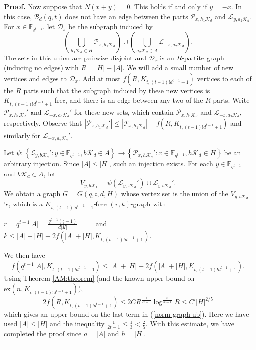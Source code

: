 \documentclass[12pt]{article}%
\newenvironment{proof}[1][Proof]{\noindent\textbf{#1.} }
{\hfill \ \rule{0.5em}{0.5em}}
\begin{document}
\begin{proof}
Now suppose that $N(x+y)  = 0$.  This holds if and only if $y = - x$.  In this case,  
$\mathcal{B}_d (q,t)$ does not have an edge between the parts $\mathcal{P}_{x , h_1 \mathcal{K}_d }$ and $\mathcal{L}_{ y , a_2 \mathcal{K}_d}$. 
For $x \in \mathbb{F}_{q^{t-1}}$, let $\mathcal{D}_{x}$ be the subgraph induced by 
\[
\left( \bigcup_{ h_1 \mathcal{K}_d \in H } \mathcal{P}_{x,h_1 \mathcal{K}_d} \right) \cup \left( 
\bigcup_{ a_2 \mathcal{K}_d \in A} \mathcal{L}_{-x,a_2 \mathcal{K}_d} 
\right).
\]
The sets in this union are pairwise disjoint 
and $\mathcal{D}_x$ is an $R$-partite graph (inducing no edges) with $R = |H| + |A|$.  
We will add a small number of new vertices and edges  to $\mathcal{D}_x$.  
Add at most $f( R , K_{ t , (t-1)! d^{t-1} + 1 } )$ vertices to each of the $R$ parts such that the subgraph induced by these new vertices is 
$K_{t , (t-1)!d^{t-1} + 1}$-free, and there is an edge between any two of the $R$ parts.  Write $\mathcal{P}_{x,h_1 \mathcal{K}_d}'$ and $\mathcal{L}_{ - x , a_2 \mathcal{K}_d}'$ for these new sets, which contain $\mathcal P_{x,h_1 \mathcal{K}_d}$ and $\mathcal L_{-x,a_2 \mathcal{K}_d}$, respectively.  Observe that 
$| \mathcal{P}_{x,h_1 \mathcal{K}_d}' | \leq 
| \mathcal{P}_{x,h_1 \mathcal{K}_d} | + f( R , K_{ t , (t-1)! d^{t-1} + 1 } )$ and similarly for $\mathcal{L}_{ - x , a_2 \mathcal{K}_d}'$.

Let $\psi:
 \left\{ \mathcal{L}_{y , b \mathcal{K}_d } ' : y \in \mathbb{F}_{q^{t-1} } , b \mathcal{K}_d \in A \right\}
	\rightarrow
		\left\{ \mathcal{P}_{x, h \mathcal{K}_d}' : x \in \mathbb{F}_{q^{t-1} } , h \mathcal{K}_d \in H \right\}
	$ be an arbitrary injection.  Since
 $|A| \leq |H|$, such an injection exists.  
 For each $y \in \mathbb{F}_{q^{t-1}}$ and $b \mathcal{K}_d \in A$, let 
\[
V_{ y,b \mathcal{K}_d} = \psi \left( \mathcal{L}_{y , b \mathcal{K}_d }' \right) \cup  \mathcal{L}_{y,b \mathcal{K}_d}' .
\]
We obtain a graph $G = G(q,t,d,H)$ whose vertex set is the union of the
$V_{y,b \mathcal{K}_d}$'s, which is
a $K_{ t , (t-1)! d^{t-1} + 1 }$-free  
$(r,k)$-graph with 
\begin{center}
$r = q^{t-1} |A| = \frac{ q^{t-1} (q-1) }{ d |H| } $ ~~~~
and~~~~ $k \leq  |A| + |H| + 2 f( |A| + |H|  , K_{t , (t-1)! d^{t-1} + 1} )$.
\end{center}
We then have 
\begin{equation}\label{norm graph ub}
f ( q^{t-1} |A| , K_{t, (t-1)!d^{t-1} + 1 } ) \leq 
 |A| + |H| + 2 f( |A| + |H|  , K_{t, (t-1)!d^{t-1} + 1 }) .
\end{equation}
Using Theorem \ref{AM:theorem} (and the known upper bound on $\mathrm{ex}(n,K_{t,(t-1)!d^{t-1}+1})$),  
\[
2 f(  R ,  K_{t, (t-1)!d^{t-1} + 1 }) \leq 2 C R^{ \frac{1}{2t-1} } \log^{ \frac{t}{2t-1} } R 
\leq C' |H|^{2/5}
\]
which gives an upper bound on the last term in (\ref{norm graph ub}).  
Here we have used $|A| \leq |H|$ and the inequality $\frac{1}{2t-1} \leq \frac{1}{3} < \frac{2}{5}$. 
With this estimate, we have completed 
the proof since $a = |A|$ and $h = |H|$.    
\end{proof} 
 
\end{document}
